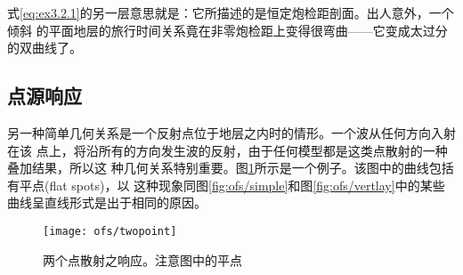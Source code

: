 式\ref{eq:ex3.2.1}的另一层意思就是：它所描述的是恒定炮检距剖面。出人意外，一个倾斜
的平面地层的旅行时间关系竟在非零炮检距上变得很弯曲——它变成太过分的双曲线了。

\subsection{点源响应}
\label{sec:3.2.3}

另一种简单几何关系是一个反射点位于地层之内时的情形。一个波从任何方向入射在该
点上，将沿所有的方向发生波的反射，由于任何模型都是这类点散射的一种叠加结果，所以这
种几何关系特别重要。图\ref{fig:ofs/twopoint}所示是一个例子。该图中的曲线包括有平点(flat spots)，以
这种现象同图\ref{fig:ofs/simple}和图\ref{fig:ofs/vertlay}中的某些曲线呈直线形式是出于相同的原因。
\begin{figure}[H]
\centering
\texttt{[image: ofs/twopoint]}
\caption[twopoint]{两个点散射之响应。注意图中的平点}
\label{fig:ofs/twopoint}
\end{figure}
